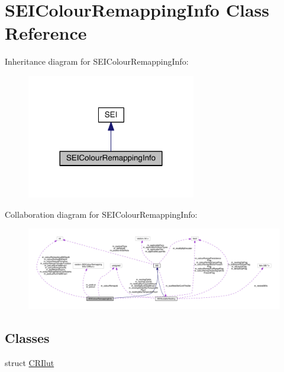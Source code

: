 \hypertarget{class_s_e_i_colour_remapping_info}{}\section{S\+E\+I\+Colour\+Remapping\+Info Class Reference}
\label{class_s_e_i_colour_remapping_info}


Inheritance diagram for S\+E\+I\+Colour\+Remapping\+Info\+:
\nopagebreak
\begin{figure}[H]
\begin{center}
\leavevmode
\includegraphics[width=209pt]{d8/d13/class_s_e_i_colour_remapping_info__inherit__graph}
\end{center}
\end{figure}


Collaboration diagram for S\+E\+I\+Colour\+Remapping\+Info\+:
\nopagebreak
\begin{figure}[H]
\begin{center}
\leavevmode
\includegraphics[width=350pt]{d5/dfa/class_s_e_i_colour_remapping_info__coll__graph}
\end{center}
\end{figure}
\subsection*{Classes}
\begin{DoxyCompactItemize}
\item 
struct \hyperlink{struct_s_e_i_colour_remapping_info_1_1_c_r_ilut}{C\+R\+Ilut}
\end{DoxyCompactItemize}
